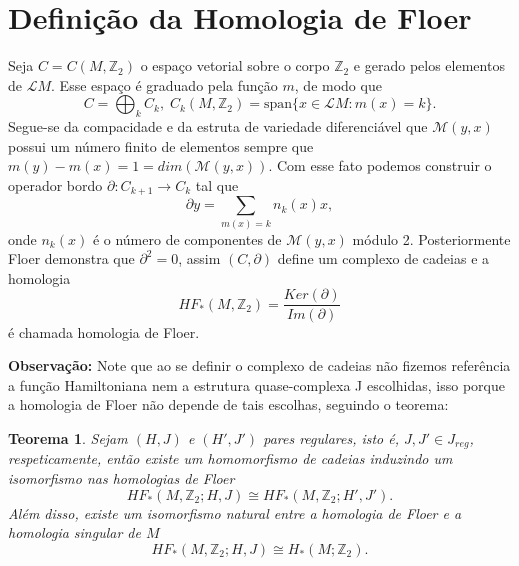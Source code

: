 \documentclass[12pt]{book}
\newtheorem{teorema}{Teorema}[section]
\newtheorem{corolario}[teorema]{Corolário}
\newcommand{\real}[1]{\mathbb{R}^{#1}}
\newcommand{\solucoesperiodicascontrateis}{\mathcal{L}M}
\begin{document}
\begin{comment}
			No caso de sistemas Hamiltonianos autônomos teremos o caso Hamiltoniano reduzido a uma função de Morse $H:M\to \real{}$ e conjunto de soluções 1-periódicas $\solucoesperiodicascontrateis$ será o conjunto de pontos críticos isolados de $H$, logo o índice de Maslov terá uma relação direta com Morse da seguinte forma:
			
			\begin{corolario}
				Sejam $(M, \omega)$ uma 2n-variedade simplectica, $H : M \to \real{}$ uma função hamiltoniana autônoma e $x \in Crit(H)$. Assumindo que $||Hess_{x}(H)|| < 2\pi$, então o índice de Maslov $\mu(x)$ da solução periódica $x$ do sistema hamiltoniano $\dot{x}(t) = X_{H}(x(t))$, pode ser relacionado o índice de Morse $Ind(x)$ do ponto crítico da função $H$ da seguinte forma:
				$$
				\mu(x) = Ind(x) - n.
				$$
			\end{corolario}	
	\end{comment}
	
	\section{Definição da Homologia de Floer}
	Seja $C = C(M, \mathbb{Z}_{2})$ o espaço vetorial sobre o corpo $\mathbb{Z}_{2}$ e gerado pelos elementos de $\solucoesperiodicascontrateis$. Esse espaço é graduado pela função $m$, de modo que
	$$
	C = \bigoplus_{k}C_{k}, \; C_{k}(M, \mathbb{Z}_{2}) = \text{span}\{x \in \solucoesperiodicascontrateis:m(x)=k \}.
	$$
	Segue-se da compacidade e da estruta de variedade diferenciável que $\mathcal{M}(y,x)$ possui um número finito de elementos sempre que $ m(y)-m(x)=1 = dim(\mathcal{M}(y,x))$. Com esse fato podemos construir o operador bordo $\partial : C_{k+1} \to C_{k}$ tal que
	$$
	\partial y = \sum_{m(x)=k} n_{k}(x) x,	
	$$
	onde $n_{k}(x)$ é o número de componentes de $\mathcal{M}(y,x)$ módulo 2. Posteriormente Floer demonstra que $\partial^{2}=0$, assim $(C,\partial)$ define um complexo de cadeias e a homologia
	$$
	HF_{*}(M, \mathbb{Z}_{2}) = \frac{Ker(\partial)}{Im(\partial)}
	$$
	é chamada homologia de Floer.
	
	\textbf{Observação:} Note que ao se definir o complexo de cadeias não fizemos referência a função Hamiltoniana nem a estrutura quase-complexa J escolhidas, isso porque a homologia de Floer não depende de tais escolhas, seguindo o teorema:
	
	\begin{teorema}
		Sejam $(H,J)$ e $(H',J')$ pares regulares, isto é, $J, J' \in J_{reg}$, respeticamente, então existe um homomorfismo de cadeias induzindo um isomorfismo nas homologias de Floer
		$$
		HF_{*}(M,\mathbb{Z}_{2};H,J) \cong HF_{*}(M,\mathbb{Z}_{2};H',J'). 
		$$
		Além disso, existe um isomorfismo natural entre a homologia de Floer e a homologia singular de $M$
		$$
		HF_{*}(M,\mathbb{Z}_{2};H,J) \cong H_{*}(M;\mathbb{Z}_{2}). 
		$$
		
	\end{teorema}
	
\end{document}
